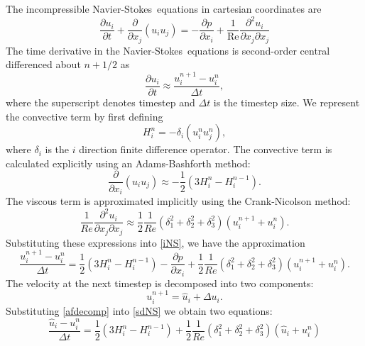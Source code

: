 \documentclass[10pt]{article}
\newcommand{\reynum}{\ensuremath{\operatorname{Re}}}
\newcommand{\NS}{\hbox{Navier}-\hbox{Stokes}\ }
\begin{document}
The incompressible \NS equations in cartesian coordinates are
\begin{equation}\label{iNS}
\frac{\partial u_i}{\partial t} + \frac{\partial}{\partial x_j}
\left(u_i u_j\right) = -\frac{\partial p}{\partial x_i} 
+ \frac{1}{\reynum}\frac{\partial^2 u_i}{\partial x_j \partial x_j}
\end{equation}
The time derivative in the \NS equations is second-order central
differenced about $n+1/2$ as
\begin{equation}
\frac{\partial u_i}{\partial t}\approx \frac{u_i^{n+1}-u_i^n}{\Delta t},
\end{equation}
where the superscript denotes timestep and $\Delta t$ is the timestep
size.  We represent the convective term by first defining
\begin{equation}
H_i^n = -\delta_i (u_i^n u_j^n),
\end{equation}
where $\delta_i$ is the $i$ direction finite difference operator.  The
convective term is calculated explicitly using an Adams-Bashforth
method:
\begin{equation}
\frac{\partial}{\partial x_i}(u_i u_j) 
\approx -\frac{1}{2}(3H_i^n - H_i^{n-1}).
\end{equation}
The viscous term is approximated implicitly using the Crank-Nicolson
method:
\begin{equation}
\frac{1}{Re}\frac{\partial^2 u_i}{\partial x_j \partial x_j}\approx
\frac{1}{2}\frac{1}{Re}(\delta_1^2+\delta_2^2+\delta_3^2)(u_i^{n+1}+u_i^n).
\end{equation}
Substituting these expressions into \autoref{iNS}, we have the
approximation
\begin{equation}\label{sdNS}
\frac{u_i^{n+1}-u_i^n}{\Delta t}= \frac{1}{2}(3H_i^n - H_i^{n-1})
	-\frac{\partial p}{\partial x_i}+
  \frac{1}{2}\frac{1}{Re}\left(\delta_1^2+\delta_2^2+\delta_3^2\right)
  \left(u_i^{n+1}+u_i^n\right).
\end{equation}
The velocity at the next timestep is decomposed into two components:
\begin{equation}\label{afdecomp}
u_i^{n+1}=\hat{u}_i + \Delta u_i.
\end{equation}
Substituting \autoref{afdecomp} into \autoref{sdNS} we obtain two
equations:
\begin{equation}\label{uhat}
\frac{\hat{u}_i-u_i^n}{\Delta t} = \frac{1}{2}(3H_i^n - H_i^{n-1})
  +\frac{1}{2}\frac{1}{Re}\left(\delta_1^2+\delta_2^2+\delta_3^2\right)
  \left(\hat{u}_i+u_i^n\right)
\end{equation}
\end{document}
